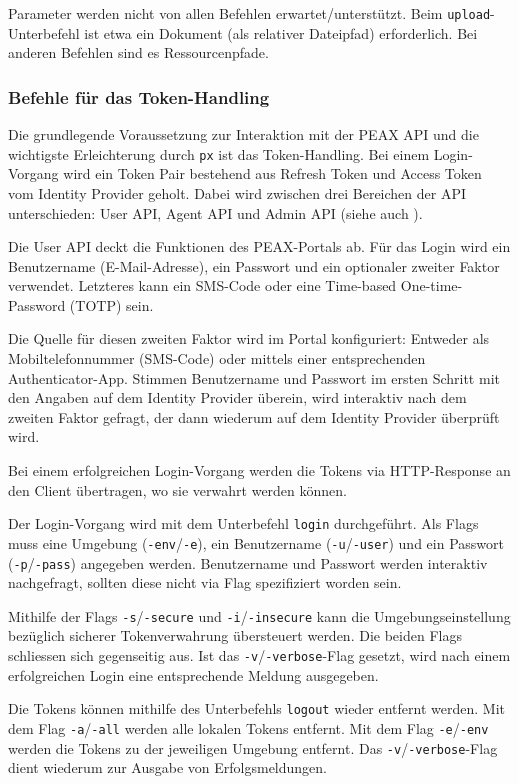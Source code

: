 Parameter werden nicht von allen Befehlen erwartet/unterstützt. Beim \texttt{upload}-Unter\-be\-fehl ist etwa ein Dokument (als relativer Dateipfad) erforderlich. Bei anderen Befehlen sind es Ressourcenpfade.

\subsubsection{Befehle für das Token-Handling}

Die grundlegende Voraussetzung zur Interaktion mit der PEAX API und die wichtigste Erleichterung durch \texttt{px} ist das Token-Handling. Bei einem Login-Vorgang wird ein Token Pair bestehend aus Refresh Token und Access Token vom Identity Provider geholt. Dabei wird zwischen drei Bereichen der API unterschieden: User API, Agent API und Admin API (siehe auch ).

Die User API deckt die Funktionen des PEAX-Portals ab. Für das Login wird ein Benutzername (E-Mail-Adresse), ein Passwort und ein optionaler zweiter Faktor verwendet. Letzteres kann ein SMS-Code oder eine Time-based One-time-Password (TOTP) sein. 

Die Quelle für diesen zweiten Faktor wird im Portal konfiguriert: Entweder als Mobiltelefonnummer (SMS-Code) oder mittels einer entsprechenden Authenticator-App. Stimmen Benutzername und Passwort im ersten Schritt mit den Angaben auf dem Identity Provider überein, wird interaktiv nach dem zweiten Faktor gefragt, der dann wiederum auf dem Identity Provider überprüft wird. 

Bei einem erfolgreichen Login-Vorgang werden die Tokens via HTTP-Response an den Client übertragen, wo sie verwahrt werden können.

Der Login-Vorgang wird mit dem Unterbefehl \texttt{login} durchgeführt. Als Flags muss eine Umgebung (\texttt{-env}/\texttt{-e}), ein Benutzername (\texttt{-u}/\texttt{-user}) und ein Passwort (\texttt{-p}/\texttt{-pass}) angegeben werden. Benutzername und Passwort werden interaktiv nachgefragt, sollten diese nicht via Flag spezifiziert worden sein.

Mithilfe der Flags \texttt{-s}/\texttt{-secure} und \texttt{-i}/\texttt{-insecure} kann die Umgebungseinstellung bezüglich sicherer Tokenverwahrung übersteuert werden. Die beiden Flags schliessen sich gegenseitig aus. Ist das \texttt{-v}/\texttt{-verbose}-Flag gesetzt, wird nach einem erfolgreichen Login eine entsprechende Meldung ausgegeben.

Die Tokens können mithilfe des Unterbefehls \texttt{logout} wieder entfernt werden. Mit dem Flag \texttt{-a}/\texttt{-all} werden alle lokalen Tokens entfernt. Mit dem Flag \texttt{-e}/\texttt{-env} werden die Tokens zu der jeweiligen Umgebung entfernt. Das \texttt{-v}/\texttt{-verbose}-Flag dient wiederum zur Ausgabe von Erfolgsmeldungen.

